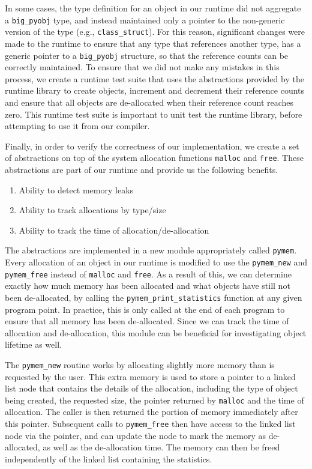 \documentclass{sigplanconf}
\begin{document}
In some cases, the type definition for an object in our runtime did not aggregate a \texttt{big\_pyobj} type, and instead maintained only a pointer to the non-generic version of the type (e.g., \texttt{class\_struct}).  For this reason, significant changes were made to the runtime to ensure that any type that references another type, has a generic pointer to a \texttt{big\_pyobj} structure, so that the reference counts can be correctly maintained.  To ensure that we did not make any mistakes in this process, we create a runtime test suite that uses the abstractions provided by the runtime library to create objects, increment and decrement their reference counts and ensure that all objects are de-allocated when their reference count reaches zero.  This runtime test suite is important to unit test the runtime library, before attempting to use it from our compiler.

Finally, in order to verify the correctness of our implementation, we create a set of abstractions on top of the system allocation functions \texttt{malloc} and \texttt{free}.  These abstractions are part of our runtime and provide us the following benefits. 

\begin{enumerate}
\item Ability to detect memory leaks
\item Ability to track allocations by type/size
\item Ability to track the time of allocation/de-allocation
\end{enumerate}

The abstractions are implemented in a new module appropriately called \texttt{pymem}.  Every allocation of an object in our runtime is modified to use the \texttt{pymem\_new} and \texttt{pymem\_free} instead of \texttt{malloc} and \texttt{free}. As a result of this, we can determine exactly how much memory has been allocated and what objects have still not been de-allocated, by calling the \texttt{pymem\_print\_statistics} function at any given program point.  In practice, this is only called at the end of each program to ensure that all memory has been de-allocated.  Since we can track the time of allocation and de-allocation, this module can be beneficial for investigating object lifetime as well.  

The \texttt{pymem\_new} routine works by allocating slightly more memory than is requested by the user.  This extra memory is used to store a pointer to a linked list node that contains the details of the allocation, including the type of object being created, the requested size, the pointer returned by \texttt{malloc} and the time of allocation.  The caller is then returned the portion of memory immediately after this pointer.  Subsequent calls to \texttt{pymem\_free} then have access to the linked list node via the pointer, and can update the node to mark the memory as de-allocated, as well as the de-allocation time.  The memory can then be freed independently of the linked list containing the statistics. 
\end{document}
